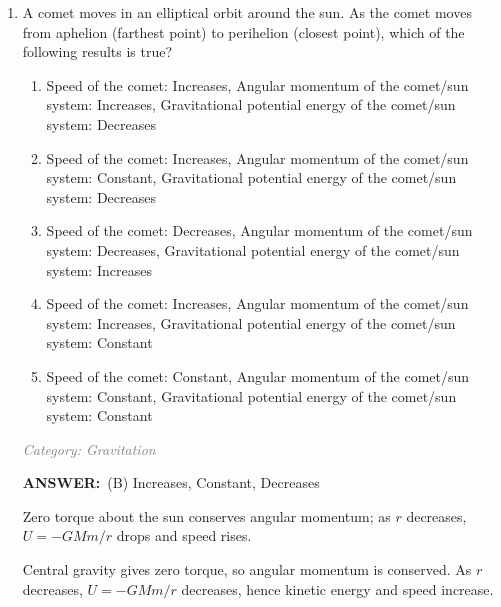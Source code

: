 ﻿\documentclass[12pt, a4paper]{article}
\makeatletter
\newcommand{\finalanswer}[1]{\textbf{ANSWER:}~#1}
\newif\if@categoryprinted
\newcommand{\category}[1]{\if@categoryprinted\relax\else\textit{\textcolor{gray}{Category: #1}}\global\@categoryprintedtrue\fi}
\newcommand{\tags}[1]{}
\makeatother
\begin{document}
\begin{CJK*}{UTF8}{gbsn}
\begin{enumerate}[itemsep=1.0em, topsep=0.6em]
\newpage

\item \label{prob:17}
A comet moves in an elliptical orbit around the sun. As the comet moves from aphelion (farthest point) to perihelion (closest point), which of the following results is true?
\begin{enumerate}
    \item Speed of the comet: Increases, Angular momentum of the comet/sun system: Increases, Gravitational potential energy of the comet/sun system: Decreases
    \item Speed of the comet: Increases, Angular momentum of the comet/sun system: Constant, Gravitational potential energy of the comet/sun system: Decreases
    \item Speed of the comet: Decreases, Angular momentum of the comet/sun system: Decreases, Gravitational potential energy of the comet/sun system: Increases
    \item Speed of the comet: Increases, Angular momentum of the comet/sun system: Increases, Gravitational potential energy of the comet/sun system: Constant
    \item Speed of the comet: Constant, Angular momentum of the comet/sun system: Constant, Gravitational potential energy of the comet/sun system: Constant
\end{enumerate}

\category{Gravitation} \tags{}
\begin{answerbox}
\finalanswer{(B) Increases, Constant, Decreases}
\end{answerbox}
\begin{insightbox}
Zero torque about the sun conserves angular momentum; as $r$ decreases, $U=-GMm/r$ drops and speed rises.
\end{insightbox}
\begin{solutionbox}

Central gravity gives zero torque, so angular momentum is conserved. As $r$ decreases, $U=-GMm/r$ decreases, hence kinetic energy and speed increase.
\end{solutionbox}


\end{enumerate}
\end{CJK*}
\end{document}
